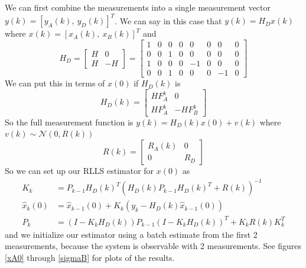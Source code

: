 \documentclass[11pt]{article}
\begin{document}
\subparagraph*{}
We can first combine the measurements into a single measurement vector $y(k)=[y_A(k),\ y_D(k)]^T$. We can say in this case that $y(k) = H_Dx(k)$ where $x(k) = [x_A(k),\ x_B(k)]^T$ and
\begin{equation*}
	H_D = \begin{bmatrix} H & 0 \\ H & -H \end{bmatrix} = \begin{bmatrix} 1&0&0&0&0&0&0&0 \\ 0&0&1&0&0&0&0&0 \\ 1&0&0&0&-1&0&0&0 \\ 0&0&1&0&0&0&-1&0 \end{bmatrix}
\end{equation*}
We can put this in terms of $x(0)$ if $H_D(k)$ is 
\begin{equation*}
	H_D(k) = \begin{bmatrix} HF_A^k & 0 \\ HF_A^k & -HF_B^k \end{bmatrix}
\end{equation*}
So the full measurement function is $y(k)=H_D(k)x(0)+v(k)$ where $v(k)\sim\mathcal{N}(0,R(k))$
\begin{equation*}
	R(k) = \begin{bmatrix} R_A(k) & 0 \\ 0 & R_D \end{bmatrix}
\end{equation*}
So we can set up our RLLS estimator for $x(0)$ as 
\begin{align*}
	K_k &= P_{k-1}H_D(k)^T(H_D(k)P_{k-1}H_D(k)^T + R(k))^{-1} \\
	\hat{x}_k(0) &= \hat{x}_{k-1}(0) + K_k(y_k-H_D(k)\hat{x}_{k-1}(0)) \\
	P_k &= (I-K_kH_D(k))P_{k-1}(I-K_kH_D(k))^T + K_kR(k)K_k^T
\end{align*}
and we initialize our estimator using a batch estimate from the first 2 measurements, because the system is observable with 2 measurements. See figures \ref{xA0} through \ref{sigmaB} for plots of the results.
\end{document}
